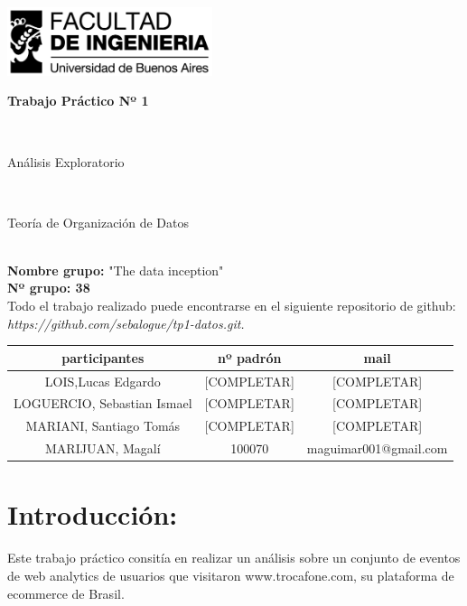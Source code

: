 \documentclass[titlepage,a4paper]{article}
\begin{document}
	\begin{titlepage}
		\hfill\includegraphics[width=6cm]{logofiuba.jpg}
		\center
		\vfill
		\vfill
		\begin{center}
			\begin{Huge}\textbf{Trabajo Práctico Nº 1}\end{Huge}\\
			\vfill
			\begin{huge}Análisis Exploratorio\end{huge}\\
			\vfill
			\begin{Large} Teoría de Organización de Datos\end{Large}\\

			\textbf{Nombre grupo:} "The data inception" \\
			\textbf{Nº grupo: 38}\\
				Todo el trabajo realizado puede encontrarse en el siguiente repositorio de github:\textit{ https://github.com/sebalogue/tp1-datos.git. }
	
			\vfill
			\begin{tabular}{|c|c|c|}
				\hline
				participantes & nº padrón & mail \\ \hline
				LOIS,Lucas Edgardo &[COMPLETAR] &  [COMPLETAR] \\ \hline		
				LOGUERCIO, Sebastian Ismael &[COMPLETAR] &  [COMPLETAR] \\ \hline
				MARIANI, Santiago Tomás &[COMPLETAR] &  [COMPLETAR] \\ \hline
				MARIJUAN, Magalí & 100070 & maguimar001@gmail.com\\ \hline
				
			\end{tabular}
			\vfill
			\vfill
			\vfill
			\vfill
			\vfill
			\vfill
		\end{center}
	
	\end{titlepage}

	\tableofcontents
	\newpage
	
	\section{Introducción:}
	Este trabajo práctico consitía en realizar un análisis sobre un conjunto de eventos de web analytics de usuarios que visitaron www.trocafone.com, su plataforma de ecommerce de Brasil.
	
\end{document}
